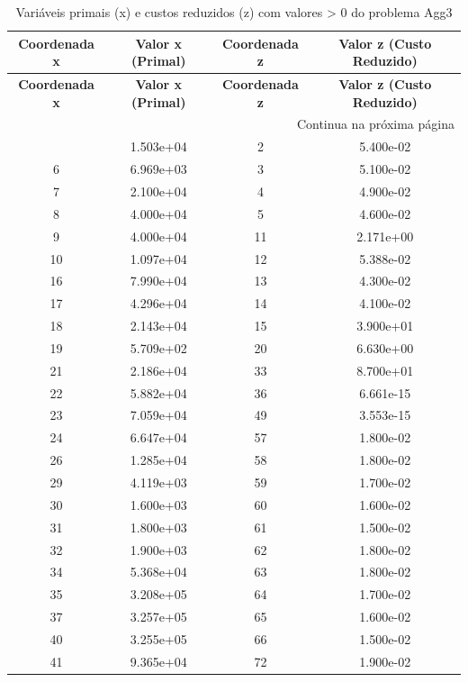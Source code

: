 \documentclass[12pt]{article}
\begin{document}
\begin{longtable}{@{}cccc@{}}
\caption{Variáveis primais (x) e custos reduzidos (z) com valores > 0 do problema Agg3} \\
\toprule
\textbf{Coordenada x} & \textbf{Valor x (Primal)} & \textbf{Coordenada z} & \textbf{Valor z (Custo Reduzido)} \\
\midrule
\endfirsthead

\toprule
\textbf{Coordenada x} & \textbf{Valor x (Primal)} & \textbf{Coordenada z} & \textbf{Valor z (Custo Reduzido)} \\
\midrule
\endhead

\midrule \multicolumn{4}{r}{{Continua na próxima página}} \\ \midrule
\endfoot

\bottomrule
\endlastfoot
1 & 1.503e+04 & 2 & 5.400e-02 \\
6 & 6.969e+03 & 3 & 5.100e-02 \\
7 & 2.100e+04 & 4 & 4.900e-02 \\
8 & 4.000e+04 & 5 & 4.600e-02 \\
9 & 4.000e+04 & 11 & 2.171e+00 \\
10 & 1.097e+04 & 12 & 5.388e-02 \\
16 & 7.990e+04 & 13 & 4.300e-02 \\
17 & 4.296e+04 & 14 & 4.100e-02 \\
18 & 2.143e+04 & 15 & 3.900e+01 \\
19 & 5.709e+02 & 20 & 6.630e+00 \\
21 & 2.186e+04 & 33 & 8.700e+01 \\
22 & 5.882e+04 & 36 & 6.661e-15 \\
23 & 7.059e+04 & 49 & 3.553e-15 \\
24 & 6.647e+04 & 57 & 1.800e-02 \\
26 & 1.285e+04 & 58 & 1.800e-02 \\
29 & 4.119e+03 & 59 & 1.700e-02 \\
30 & 1.600e+03 & 60 & 1.600e-02 \\
31 & 1.800e+03 & 61 & 1.500e-02 \\
32 & 1.900e+03 & 62 & 1.800e-02 \\
34 & 5.368e+04 & 63 & 1.800e-02 \\
35 & 3.208e+05 & 64 & 1.700e-02 \\
37 & 3.257e+05 & 65 & 1.600e-02 \\
40 & 3.255e+05 & 66 & 1.500e-02 \\
41 & 9.365e+04 & 72 & 1.900e-02 \\

\end{longtable}
\end{document}
